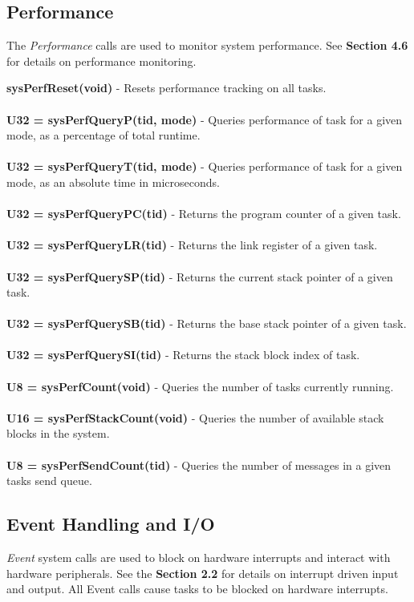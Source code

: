 \documentclass[twoside,a4paper]{refart}
\begin{document}
\subsection{Performance}

The \textit{Performance} calls are used to monitor system performance. See \textbf{Section 4.6} for details on performance monitoring.

\textbf{sysPerfReset(void)} - Resets performance tracking on all tasks.\\\\
\textbf{U32 = sysPerfQueryP(tid, mode)} - Queries performance of task for a given mode, as a percentage of total runtime.\\\\
\textbf{U32 = sysPerfQueryT(tid, mode)} - Queries performance of task for a given mode, as an absolute time in microseconds.\\\\
\textbf{U32 = sysPerfQueryPC(tid)} - Returns the program counter of a given task.\\\\
\textbf{U32 = sysPerfQueryLR(tid)} - Returns the link register of a given task.\\\\
\textbf{U32 = sysPerfQuerySP(tid)} - Returns the current stack pointer of a given task.\\\\
\textbf{U32 = sysPerfQuerySB(tid)} - Returns the base stack pointer of a given task.\\\\
\textbf{U32 = sysPerfQuerySI(tid)} - Returns the stack block index of task.\\\\
\textbf{U8 = sysPerfCount(void)} - Queries the number of tasks currently running. \\\\
\textbf{U16 = sysPerfStackCount(void)} - Queries the number of available stack blocks in the system. \\\\
\textbf{U8 = sysPerfSendCount(tid)} - Queries the number of messages in a given tasks send queue.

\subsection{Event Handling and I/O}

\textit{Event} system calls are used to block on hardware interrupts and interact with hardware peripherals. See the \textbf{Section 2.2} for details on interrupt driven input and output. All Event calls cause tasks to be blocked on hardware interrupts.
\end{document}
